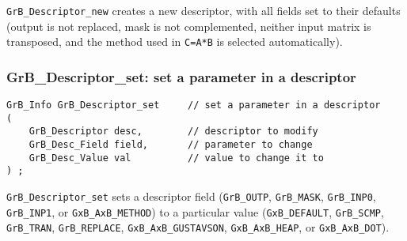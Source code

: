 \documentclass[12pt]{article}
\begin{document}
\verb'GrB_Descriptor_new' creates a new descriptor, with all fields set to
their defaults (output is not replaced, mask is not complemented, neither
input matrix is transposed, and the method used in \verb'C=A*B' is
selected automatically).

\newpage
\subsubsection{{\sf GrB\_Descriptor\_set:}  set a parameter in a descriptor}
\label{descriptor_set}

\begin{mdframed}[userdefinedwidth=6in]
{\footnotesize
\begin{verbatim}
GrB_Info GrB_Descriptor_set     // set a parameter in a descriptor
(
    GrB_Descriptor desc,        // descriptor to modify
    GrB_Desc_Field field,       // parameter to change
    GrB_Desc_Value val          // value to change it to
) ;
\end{verbatim} } \end{mdframed}

\verb'GrB_Descriptor_set' sets a descriptor field (\verb'GrB_OUTP',
\verb'GrB_MASK', \verb'GrB_INP0', \verb'GrB_INP1', or \verb'GxB_AxB_METHOD') to
a particular value (\verb'GxB_DEFAULT', \verb'GrB_SCMP', \verb'GrB_TRAN',
\verb'GrB_REPLACE', \verb'GxB_AxB_GUSTAVSON', \verb'GxB_AxB_HEAP', or
\verb'GxB_AxB_DOT').
\end{document}
